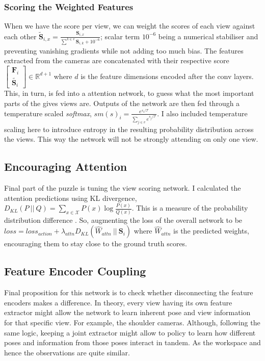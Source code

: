 \subsubsection{Scoring the Weighted Features}
When we have the score per view, we can weight the scores of each view against each other
\( \tilde{\mathbf{S}}_{i, x} = \frac{\mathbf{S}_{i, x}}{\sum_{}^{k \in v} \mathbf{S}_{i, k} + 10^{-6}} \); scalar term $10^{-6}$ being a numerical stabiliser and preventing vanishing gradients while not adding too much bias. The features extracted from the cameras are concatenated with their respective score \( \begin{bmatrix} \mathbf{F}_i \\ \tilde{\mathbf{S}_i} \end{bmatrix} \in \mathbb{R}^{d + 1}\) where $d$ is the feature dimensions encoded after the conv layers. This, in turn, is fed into a attention network, to guess what the most important parts of the gives views are. Outputs of the network are then fed through a temperature scaled \emph{softmax}, \(sm\left(s\right)_i = \frac{e^{s_i / \mathcal{T}}}{\sum_{j \in v}{e^{s_j / \mathcal{T}}}}\). I also included temperature scaling here to introduce entropy in the resulting probability distribution across the views. This way the network will not be strongly attending on only one view.

\subsection{Encouraging Attention}
Final part of the puzzle is tuning the view scoring network. I calculated the attention predictions using KL divergence, \(D_{KL}\left(P ~||~ Q\right) = \sum_{x \in \mathcal{X}} P\left(x\right) \log \frac{P\left(x\right)}{Q\left(x\right)}\). This is a measure of the probability distribution difference \cite{dkl}. So, augmenting the loss of the overall network to be \(loss = loss_{action} + \lambda_{attn} D_{KL}\left( \hat{W}_{attn} ~||~ \mathbf{S}_i\right)\) where $\hat{W}_{attn}$ is the predicted weights, encouraging them to stay close to the ground truth scores.

\subsection{Feature Encoder Coupling}
Final proposition for this network is to check whether disconnecting the feature encoders makes a difference. In theory, every view having its own feature extractor might allow the network to learn inherent pose and view information for that specific view. For example, the shoulder cameras.  Although, following the same logic, keeping a joint extractor might allow to policy to learn how different poses and information from those poses interact in tandem. As the workspace and hence the observations are quite similar.

